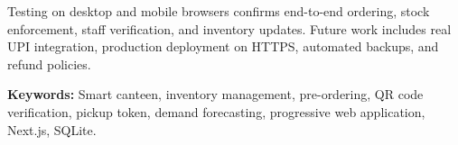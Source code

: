 \vspace{15pt}

\noindent
Testing on desktop and mobile browsers confirms end-to-end ordering, stock enforcement, staff verification, and inventory updates. Future work includes real UPI integration, production deployment on HTTPS, automated backups, and refund policies.

\vspace{15pt}

\noindent
\textbf{Keywords:} Smart canteen, inventory management, pre-ordering, QR code verification, pickup token, demand forecasting, progressive web application, Next.js, SQLite.
